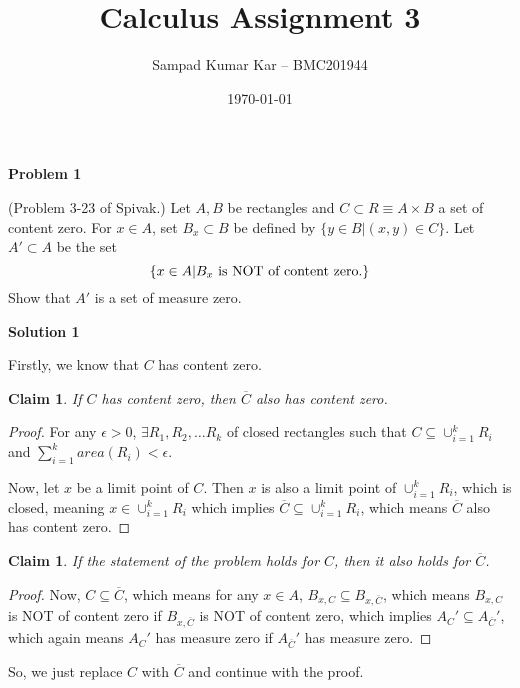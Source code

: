 \documentclass[12pt,a4paper]{article}
\title{Calculus Assignment 3}
\author{Sampad Kumar Kar -- BMC201944}
\date{\today}
\newtheorem{claim}[theorem]{Claim}
\theoremstyle{definition}
\begin{document}
\maketitle

\begin{flushleft}

{\bf  Problem 1}

(Problem 3-23 of Spivak.) Let $A,B$ be rectangles and $C \subset R \equiv A \times B$ a set of content zero. For $x \in A$, set $B_x \subset B$ be defined by $\{y \in B|(x,y) \in C\}$. Let $A' \subset A$ be the set
\[
\{x \in A|\textup{$B_x$ is NOT of content zero.}\}
\]
Show that $A'$ is a set of measure zero.

\bigskip

{\bf Solution 1}

\medskip

Firstly, we know that $C$ has content zero.

\begin{claim}
	If $C$ has content zero, then $\overline{C}$ also has content zero.
\end{claim}

\begin{proof}
	For any $\epsilon > 0$, $\exists R_1, R_2, \dots R_k$ of closed rectangles such that $C \subseteq \cup_{i = 1}^{k} R_i $ and $\sum_{i = 1}^{k} area(R_i) < \epsilon $.

	Now, let $x$ be a limit point of $C$. Then $x$ is also a limit point of $\cup_{i = 1}^{k} R_i$, which is closed, meaning $x \in \cup_{i = 1}^{k} R_i$ which implies $\overline{C} \subseteq \cup_{i = 1}^{k} R_i $, which means $\overline{C} $ also has content zero.
\end{proof}

\begin{claim}
	If the statement of the problem holds for $C$, then it also holds for $\overline{C}$.
\end{claim}

\begin{proof}
	Now, $C \subseteq \overline{C}$, which means for any $x \in A$, $B_{x,C} \subseteq B_{x,\overline{C}} $, which means $B_{x,C} $ is NOT of content zero if $B_{x,\overline{C}} $ is NOT of content zero, which implies $A_C' \subseteq A_{\overline{C}}'$, which again means $A_C'$ has measure zero if $A_{\overline{C}}'$ has measure zero.
\end{proof}

So, we just replace $C$ with $\overline{C}$ and continue with the proof.
\medskip


\end{flushleft}
\end{document}

